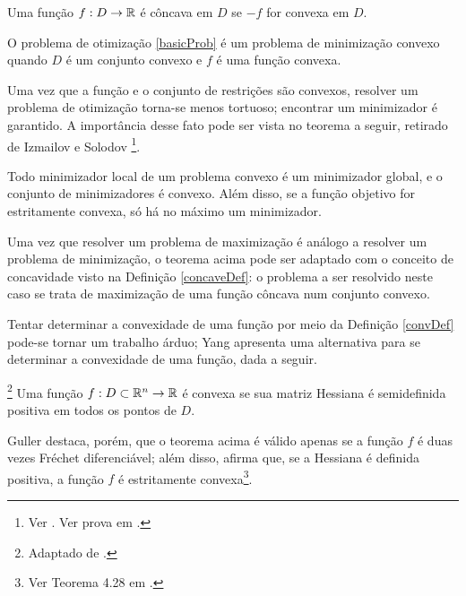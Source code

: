 \begin{definition}
Uma fun\c{c}\~{a}o $f: D \to \mathbb{R}$ \'{e} c\^{o}ncava em $D$ se $-f$ for convexa em $D$.
\end{definition}

\begin{definition}\label{concaveDef}
O problema de otimiza\c{c}\~{a}o \eqref{basicProb} \'{e} um problema de minimiza\c{c}\~{a}o convexo quando $D$ \'{e} um conjunto convexo e $f$ \'{e} uma fun\c{c}\~{a}o convexa.
\end{definition}

Uma vez que a fun\c{c}\~{a}o e o conjunto de restri\c{c}\~{o}es s\~{a}o convexos, resolver um problema de otimiza\c{c}\~{a}o torna-se menos tortuoso; encontrar um minimizador \'{e} garantido. A import\^{a}ncia desse fato pode ser vista no teorema a seguir, retirado de Izmailov e Solodov \footnote{Ver \cite[p. 69]{izmailov}. Ver prova em \cite[pp. 69-70]{izmailov}.}.

\begin{theorem}\label{theoMinConv}
Todo minimizador local de um problema convexo \'{e} um minimizador global, e o conjunto de minimizadores \'{e} convexo. Al\'{e}m disso, se a fun\c{c}\~{a}o objetivo for estritamente convexa, s\'{o} h\'{a} no m\'{a}ximo um minimizador.
\end{theorem}

Uma vez que resolver um problema de maximiza\c{c}\~{a}o \'{e} an\'{a}logo a resolver um problema de minimiza\c{c}\~{a}o, o teorema acima pode ser adaptado com o conceito de concavidade visto na Defini\c{c}\~{a}o \ref{concaveDef}: o problema a ser resolvido neste caso se trata de maximiza\c{c}\~{a}o de uma fun\c{c}\~{a}o c\^{o}ncava num conjunto convexo.

Tentar determinar a convexidade de uma fun\c{c}\~{a}o por meio da Defini\c{c}\~{a}o \ref{convDef} pode-se tornar um trabalho \'{a}rduo; Yang apresenta uma alternativa para se determinar a convexidade de uma fun\c{c}\~{a}o, dada a seguir.

\begin{theorem}\footnote{Adaptado de \cite[pp. 56-57]{yang}.}
Uma fun\c{c}\~{a}o $f: D \subset \mathbb{R}^{n} \to \mathbb{R}$ \'{e} convexa se sua matriz Hessiana \'{e} semidefinida positiva em todos os pontos de $D$.
\end{theorem}

Guller destaca, por\'{e}m, que o teorema acima \'{e} v\'{a}lido apenas se a fun\c{c}\~{a}o $f$ \'{e} duas vezes Fr\'{e}chet diferenci\'{a}vel; al\'{e}m disso, afirma que, se a Hessiana \'{e} definida positiva, a fun\c{c}\~{a}o $f$ \'{e} estritamente convexa\footnote{Ver Teorema 4.28 em \cite[p. 99]{guller}.}.

